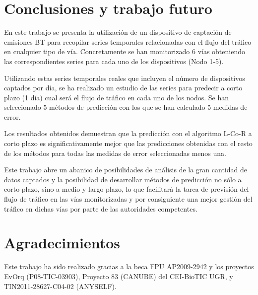 \documentclass[runningheads]{llncs}
\begin{document}

\section{Conclusiones y trabajo futuro}
\label{sec:conclusions}

En este trabajo se presenta la utilización de un dispositivo de captación de emisiones BT para
recopilar series temporales relacionadas con el flujo del tráfico en cualquier tipo de vía.
Concretamente se han monitorizado 6 vías obteniendo las correspondientes series para cada uno de
los  dispositivos (Nodo 1-5). 

Utilizando estas series temporales reales que incluyen el número de dispositivos captados por día,
se ha realizado un estudio de las series para predecir a corto plazo (1 día) cual será el flujo de
tráfico en cada uno de los nodos. Se han seleccionado 5 métodos de predicción con los que se han
calculado 5 medidas de error. 

Los resultados obtenidos demuestran que la predicción con el algoritmo L-Co-R a corto plazo es
significativamente mejor que las predicciones obtenidas con el resto de los métodos para todas las
medidas de error seleccionadas menos una. 

Este trabajo abre un abanico de posibilidades de análisis de la gran cantidad de datos captados y
la posibilidad de desarrollar métodos de predicción no sólo a corto plazo, sino a medio y largo
plazo, lo que facilitará la tarea de previsión del flujo de tráfico en las vías monitorizadas y por
consiguiente una mejor gestión del tráfico en dichas vías por parte de las autoridades competentes.

\section{Agradecimientos}
Este trabajo ha sido realizado gracias a la beca FPU AP2009-2942 y los
proyectos EvOrq (P08-TIC-03903), Proyecto 83 (CANUBE) del CEI-BioTIC
UGR, y TIN2011-28627-C04-02 (ANYSELF). 


\end{document}
